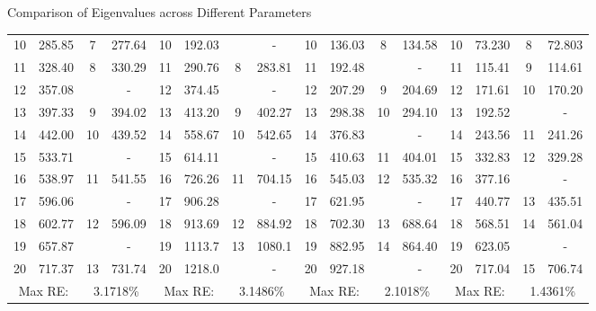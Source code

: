 \documentclass[8pt]{beamer}
\begin{document}
\begin{frame}{Comparison of Eigenvalues across Different Parameters}
{\begin{tabular}{|cccc||cccc||cccc||cccc|}
            {10} & 285.85 & 7     & 277.64 & {10}    & {192.03} &      & {-} & 10    & 136.03 & 8     & 134.58 & 10    & 73.230 & 8     & 72.803 \\
            {11} & 328.40 & 8     & 330.29 & 11    & 290.76 & 8     & 283.81 & {11}    & {192.48} &       & {-} & 11    & 115.41 & 9     & 114.61 \\
            {12} & {357.08} &       & {-} & {12}    & {374.45} &       & {-} & 12    & 207.29 & 9     & 204.69 & 12    & 171.61 & 10    & 170.20 \\
            {13} & 397.33 & 9     & 394.02 & 13    & 413.20 & 9     & 402.27 & 13    & 298.38 & 10    & 294.10 & {13}    & {192.52} &       & {-} \\
            {14} & 442.00   & 10    & 439.52 & 14    & 558.67 & 10    & 542.65 & {14}    & {376.83} &       & {-} & 14    & 243.56 & 11    & 241.26 \\
            {15} & {533.71} &       & {-} & {15}    & {614.11} &       & {-} & 15    & 410.63 & 11    & 404.01 & 15    & 332.83 & 12    & 329.28 \\
            {16} & 538.97 & 11    & 541.55 & 16    & 726.26 & 11    & 704.15 & 16    & 545.03 & 12    & 535.32 & {16}    & {377.16} &       & {-} \\
            {17} & {596.06} &       & {-} & {17}    & {906.28} &       & {-} & {17}    & {621.95} &       & {-} & 17    & 440.77 & 13    & 435.51 \\
            {18} & 602.77 & 12    & 596.09 & 18    & 913.69 & 12    & 884.92 & 18    & 702.30 & 13    & 688.64 & 18    & 568.51 & 14    & 561.04 \\
            {19} & {657.87} &       & {-} & 19    & 1113.7 & 13    & 1080.1 & 19    & 882.95 & 14    & 864.40 & {19}    & {623.05} &       & {-} \\
            {20} & 717.37 & 13    & 731.74 & {20}    & {1218.0}  &       & {-} & {20}    & {927.18} &       & {-} & 20    & 717.04 & 15    & 706.74 \\
            \hline
            \multicolumn{2}{|c}{Max RE:} & \multicolumn{2}{c||}{3.1718\%} & \multicolumn{2}{c}{Max RE:} & \multicolumn{2}{c||}{3.1486\%} & \multicolumn{2}{c}{Max RE:} & \multicolumn{2}{c||}{2.1018\%} & \multicolumn{2}{c}{Max RE:} & \multicolumn{2}{c|}{1.4361\%} \\
            \hline
        \end{tabular}}
    \end{frame}
        
\end{document}
